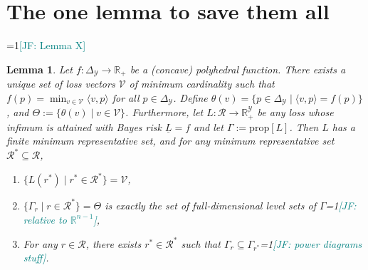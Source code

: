 \documentclass[11pt]{article}
\newcommand{\Comments}{1}
\newcommand{\mynote}[2]{\ifnum\Comments=1\textcolor{#1}{#2}\fi}
\newcommand{\raf}[1]{\mynote{darkgreen}{[RF: #1]}}
\newcommand{\jessie}[1]{\mynote{teal}{[JF: #1]}}
\newcommand{\reals}{\mathbb{R}}
\newcommand{\prop}[1]{\mathrm{prop}[#1]}
\newcommand{\simplex}{\Delta_\Y}
\newcommand{\R}{\mathcal{R}}
\newcommand{\U}{\mathcal{U}}
\newcommand{\V}{\mathcal{V}}
\newcommand{\Y}{\mathcal{Y}}
\newcommand{\risk}[1]{\underline{#1}}
\newcommand{\inprod}[2]{\langle #1, #2 \rangle}%
\newtheorem{lemma}{Lemma}
\begin{document}
%

\section{The one lemma to save them all}

\jessie{Lemma X}
\begin{lemma}
	Let $f: \simplex \to \reals_+$ be a (concave) polyhedral function.
	There exists a unique set of loss vectors $\V$ of minimum cardinality such that $f(p) = \min_{v \in \V} \inprod{v}{p}$ for all $p\in\simplex$.
	Define $\theta(v) = \{p \in \simplex \mid \inprod{v}{p} = f(p)\}$, and $\Theta := \{\theta(v) \mid v \in \V\}$.
	Furthermore, let $L: \R \to \reals^\Y_+$ be any loss whose infimum is attained with Bayes risk $\risk L=f$ and let $\Gamma := \prop{L}$.
	Then $L$ has a finite minimum representative set, and for any minimum representative set $\R^* \subseteq \R$,
	\begin{enumerate}
		\item $\{L(r^*) \mid r^* \in \R^*\} = \V$,
		\item $\{\Gamma_r \mid r \in \R^*\} = \Theta$ is exactly the set of full-dimensional level sets of $\Gamma$\jessie{relative to $\reals^{n-1}$},
		\item For any $r \in \R$, there exists $r^* \in \R^*$ such that $\Gamma_r \subseteq \Gamma_{r^*}$\jessie{power diagrams stuff}.
	\end{enumerate}
\end{lemma}
\end{document}
